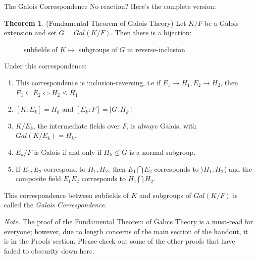 \documentclass[12pt]{article}
\theoremstyle{definition}
\theoremstyle{definition}
\theoremstyle{definition}
\newtheorem{theorem}{Theorem}[section]
\theoremstyle{definition}
\theoremstyle{definition}
\theoremstyle{definition}
\begin{document}
\begin{section}{The Galois Correspondence}
    No reaction? Here's the complete version:
    \begin{theorem}{(Fundamental Theorem of Galois Theory)}
        Let \(K/F\) be a Galois extension and set \(G=Gal(K/F)\). Then there is a bijection:
        \begin{figure}[H]
        \centering
        \caption{subfields of \(K \mapsto\) subgroups of \(G\) in reverse-inclusion}
    \end{figure}
    Under this correspondence:
    \begin{enumerate}
        \item This correspondence is inclusion-reversing, i.e if \(E_1 \to H_1, E_2 \to H_2\), then \(E_1\subseteq E_2 \Leftrightarrow H_2 \leq H_1.\)
        \item \([K:E_k] = H_k\) and \([E_k:F] = \mid G: H_k\mid\)
        \item \(K/E_k\), the intermediate fields over \(F\), is always Galois, with \(Gal(K/E_k) = H_k.\)
        \item \(E_k/F\) is Galois if and only if \(H_k \leq G\) is a normal subgroup.
        \item If \(E_1, E_2\) correspond to \(H_1, H_2\), then \(E_1 \bigcap E_2\) corresponds to \(\rangle H_1, H_2 \langle\) and the composite field 
        \(E_1E_2\) corresponds to \(H_1 \bigcap H_2.\)\\
    \end{enumerate}
    This correspondence between subfields of \(K\) and subgroups of \(Gal(K/F)\) is called the \textit{Galois Correspondence}.
    \end{theorem}
    \textit{Note.} The proof of the Fundamental Theorem of Galois Theory is a must-read for everyone; however, due to length concerns of the main section 
    of the handout, it is in the Proofs section. Please check out some of the other proofs that have faded to obscurity down here.
\end{section}
\end{document}
